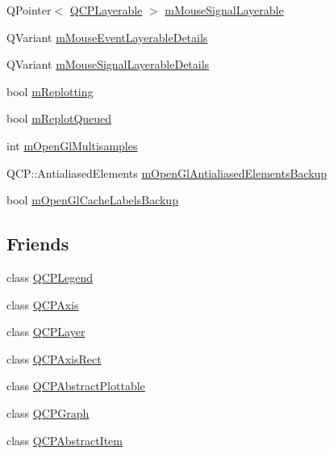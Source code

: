 \begin{DoxyCompactItemize}
\item 
Q\+Pointer$<$ \mbox{\hyperlink{class_q_c_p_layerable}{Q\+C\+P\+Layerable}} $>$ \mbox{\hyperlink{class_q_custom_plot_adf81640dbf365bd4fa22494e3e504e70}{m\+Mouse\+Signal\+Layerable}}
\item 
Q\+Variant \mbox{\hyperlink{class_q_custom_plot_ad604958ef16fc022c474521a08d88a2d}{m\+Mouse\+Event\+Layerable\+Details}}
\item 
Q\+Variant \mbox{\hyperlink{class_q_custom_plot_a2f313604bb22781633137915f3c100e6}{m\+Mouse\+Signal\+Layerable\+Details}}
\item 
bool \mbox{\hyperlink{class_q_custom_plot_ab30daeca6612c3948afd368dce5f1c39}{m\+Replotting}}
\item 
bool \mbox{\hyperlink{class_q_custom_plot_acedeef316dfcde835b8ea0112cec2a77}{m\+Replot\+Queued}}
\item 
int \mbox{\hyperlink{class_q_custom_plot_aacafac2b2280b6a868a4b734273a394c}{m\+Open\+Gl\+Multisamples}}
\item 
Q\+C\+P\+::\+Antialiased\+Elements \mbox{\hyperlink{class_q_custom_plot_adbf005715d5f8550511819a4baf841fb}{m\+Open\+Gl\+Antialiased\+Elements\+Backup}}
\item 
bool \mbox{\hyperlink{class_q_custom_plot_ab1692469dde841080fa33719533bf2b7}{m\+Open\+Gl\+Cache\+Labels\+Backup}}
\end{DoxyCompactItemize}
\subsection*{Friends}
\begin{DoxyCompactItemize}
\item 
class \mbox{\hyperlink{class_q_custom_plot_a8429035e7adfbd7f05805a6530ad5e3b}{Q\+C\+P\+Legend}}
\item 
class \mbox{\hyperlink{class_q_custom_plot_af123edeca169ec7a31958a1d714e1a8a}{Q\+C\+P\+Axis}}
\item 
class \mbox{\hyperlink{class_q_custom_plot_a5dbf96bf7664c1b6fce49063eeea6eef}{Q\+C\+P\+Layer}}
\item 
class \mbox{\hyperlink{class_q_custom_plot_acbf20ecb140f66c5fd1bc64ae0762990}{Q\+C\+P\+Axis\+Rect}}
\item 
class \mbox{\hyperlink{class_q_custom_plot_a53cf0e76aca814550c796fed79e345d6}{Q\+C\+P\+Abstract\+Plottable}}
\item 
class \mbox{\hyperlink{class_q_custom_plot_ad0c52e327d94c699d415fd61f930700a}{Q\+C\+P\+Graph}}
\item 
class \mbox{\hyperlink{class_q_custom_plot_a93e962f2e677e31ecc575bb884e46adf}{Q\+C\+P\+Abstract\+Item}}
\end{DoxyCompactItemize}


